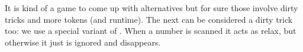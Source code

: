 \typebuffer[c] \getbuffer[c,b]

\fi

It is kind of a game to come up with alternatives but for sure those involve
dirty tricks and more tokens (and runtime). The next can be considered a dirty
trick too: we use a special variant of \type {\relax}. When a number is scanned
it acts as relax, but otherwise it just is ignored and disappears.

\ifdefined\norelax\else\let\norelax\relax\fi

\startbuffer[c]
\stopbuffer

\typebuffer[c] \getbuffer[c,b]

\stopsectionlevel

\popoverloadmode

\stopdocument




